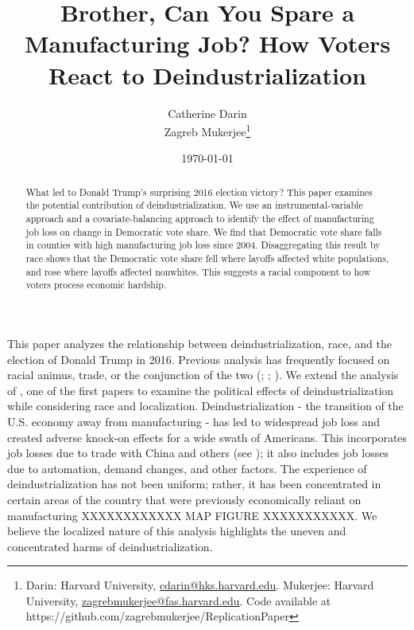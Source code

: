 \documentclass[]{AEA}
\begin{document}
\title{Brother, Can You Spare a Manufacturing Job? How Voters React to
Deindustrialization}


\author{
  Catherine Darin\\
  Zagreb Mukerjee\thanks{
  Darin: Harvard
University, \href{mailto:cdarin@hks.harvard.edu}{cdarin@hks.harvard.edu}.
  Mukerjee: Harvard
University, \href{mailto:zagrebmukerjee@fas.harvard.edu}{zagrebmukerjee@fas.harvard.edu}.
  Code available at https://github.com/zagrebmukerjee/ReplicationPaper
}
}

\date{\today}
\pubVolume{}
\pubIssue{}
\JEL{}
\Keywords{}

\begin{abstract}
What led to Donald Trump's surprising 2016 election victory? This paper
examines the potential contribution of deindustrialization. We use an
instrumental-variable approach and a covariate-balancing approach to
identify the effect of manufacturing job loss on change in Democratic
vote share. We find that Democratic vote share falls in counties with
high manufacturing job loss since 2004. Disaggregating this result by
race shows that the Democratic vote share fell where layoffs affected
white populations, and rose where layoffs affected nonwhites. This
suggests a racial component to how voters process economic hardship.
\end{abstract}


\maketitle

This paper analyzes the relationship between deindustrialization, race,
and the election of Donald Trump in 2016. Previous analysis has
frequently focused on racial animus, trade, or the conjunction of the
two (\cite{Autor20}; \cite{Che16}; \cite{BR21}). We extend the analysis
of \cite{Baccini21}, one of the first papers to examine the political
effects of deindustrialization while considering race and localization.
Deindustrialization - the transition of the U.S. economy away from
manufacturing - has led to widespread job loss and created adverse
knock-on effects for a wide swath of Americans. This incorporates job
losses due to trade with China and others (see \cite{Acemoglu16}); it
also includes job losses due to automation, demand changes, and other
factors. The experience of deindustrialization has not been uniform;
rather, it has been concentrated in certain areas of the country that
were previously economically reliant on manufacturing XXXXXXXXXXXX MAP
FIGURE XXXXXXXXXXX. We believe the localized nature of this analysis
highlights the uneven and concentrated harms of deindustrialization.
\end{document}
